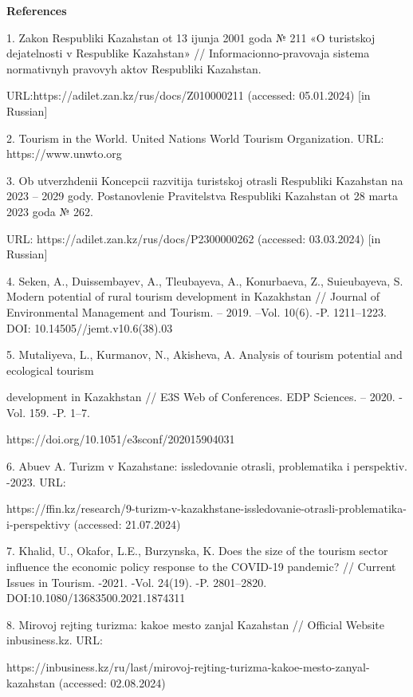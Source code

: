 \begin{center}
{\bfseries References}
\end{center}


\begin{noparindent}
1.
Zakon Respubliki Kazahstan ot 13 ijunja 2001 goda № 211 «O turistskoj
dejatel\textquotesingle nosti v Respublike Kazahstan» //
Informacionno-pravovaja sistema normativnyh pravovyh aktov Respubliki
Kazahstan.

URL:https://adilet.zan.kz/rus/docs/Z010000211 (accessed:
05.01.2024) {[}in Russian{]}

2.
Tourism in the World. United Nations World Tourism Organization. URL:
https://www.unwto.org

3.
Ob utverzhdenii Koncepcii razvitija turistskoj otrasli Respubliki
Kazahstan na 2023 -- 2029 gody. Postanovlenie
Pravitel\textquotesingle stva Respubliki Kazahstan ot 28 marta 2023
goda № 262.

URL: https://adilet.zan.kz/rus/docs/P2300000262 (accessed:
03.03.2024) {[}in Russian{]}

4.
Seken, A., Duissembayev, A., Tleubayeva, A., Konurbaeva, Z.,
Suieubayeva, S. Modern potential of rural tourism development in
Kazakhstan // Journal of Environmental Management and Tourism. --
2019. --Vol. 10(6). -P. 1211--1223. DOI: 10.14505//jemt.v10.6(38).03

5.
Mutaliyeva, L., Kurmanov, N., Akisheva, A. Analysis of tourism
potential and ecological tourism

development in Kazakhstan // E3S Web
of Conferences. EDP Sciences. -- 2020. - Vol. 159. -P. 1--7.

https://doi.org/10.1051/e3sconf/202015904031

6.
Abuev A. Turizm v Kazahstane: issledovanie otrasli, problematika i
perspektiv. -2023. URL:

https://ffin.kz/research/9-turizm-v-kazakhstane-issledovanie-otrasli-problematika-i-perspektivy
(accessed: 21.07.2024)

7.
Khalid, U., Okafor, L.E., Burzynska, K. Does the size of the tourism
sector influence the economic policy response to the COVID-19
pandemic? // Current Issues in Tourism. -2021. -Vol. 24(19). -P.
2801--2820. DOI:10.1080/13683500.2021.1874311

8.
Mirovoj rejting turizma: kakoe mesto zanjal Kazahstan // Official
Website inbusiness.kz. URL:

https://inbusiness.kz/ru/last/mirovoj-rejting-turizma-kakoe-mesto-zanyal-kazahstan
(accessed: 02.08.2024)


\end{noparindent}
